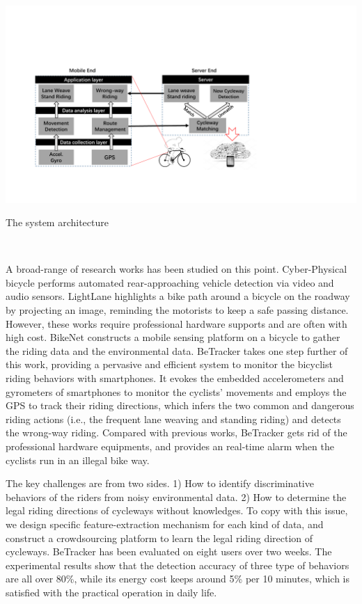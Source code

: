 \documentclass{sigchi-ext}
\def\sysname{BeTracker }
\def\ie{i.e., }
\begin{document}
\begin{marginfigure}[1pc]
	\begin{turn}{90}
		\begin{minipage}{2\marginparwidth}
			\centering
			\includegraphics[width=1.95\marginparwidth]{figures/sys.pdf}
			\caption{The system architecture } ~\label{fig:sys}
		\end{minipage}
	\end{turn}
\end{marginfigure}

 A broad-range of research works has been studied on this point. Cyber-Physical bicycle \cite{Bib:imp2010} performs automated rear-approaching vehicle detection via video and audio sensors. LightLane \cite{bib:Lig2014} highlights a bike path around a bicycle on the roadway by projecting an image, reminding the motorists to keep a safe passing distance. However, these works require professional hardware supports and are often with high cost.  BikeNet \cite{Bib:Bik2009} constructs a mobile sensing platform on a bicycle to gather the riding data and the environmental data. \sysname takes one step further of this work,  providing a pervasive and efficient system to monitor the bicyclist riding behaviors with smartphones. It evokes the embedded accelerometers and gyrometers of smartphones to monitor the cyclists' movements and employs the GPS to track their riding directions, which infers the two common and dangerous riding actions (\ie the frequent lane weaving and standing riding) and detects the wrong-way riding.  
Compared with previous works, \sysname gets rid of the professional hardware equipments, and provides an real-time alarm when the cyclists run in an illegal bike way. 

The key challenges are from two sides. 1) How to identify discriminative behaviors of the riders from noisy environmental data. 2) How to determine the legal riding directions of cycleways without knowledges.   
To copy with this issue, we design specific feature-extraction mechanism for each kind of data, and construct a crowdsourcing platform to learn the legal riding direction of cycleways. 
\sysname has been evaluated on eight users over two weeks. The experimental results show that the detection accuracy of three type of behaviors are all over 80\%, while its energy cost keeps around 5\% per 10 minutes, which is satisfied with the practical operation in daily life.  
\end{document}
